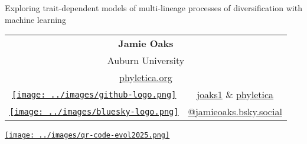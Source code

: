 \begin{frame}[t]
    \begin{columns}[c]

        \begin{minipage}[c][\headlessframetextheight][c]{\columnwidth}
        \begin{center}

            \begin{displaybox}[0.88\linewidth]
            \begin{center}
                \begin{minipage}[c][0.22\textheight][c]{0.88\linewidth}
                \begin{center}
                    \large Exploring trait-dependent models of multi-lineage
                    processes of diversification with machine learning
                \end{center}
                \end{minipage}
            \end{center}
            \end{displaybox}

            \vspace{2.5ex}
            \setlength{\tabcolsep}{0.15em}
            \begin{tabular}{@{}cc@{}}
                \multicolumn{2}{c}{\large\bf Jamie Oaks} \\
                \multicolumn{2}{c}{Auburn University} \\ %
                \multicolumn{2}{c}{\href{https://phyletica.org}{phyletica.org}} \\
                \href{https://github.com/joaks1}{\texttt{[image: ../images/github-logo.png]}}
                & \href{https://github.com/joaks1}{joaks1} \& \href{https://github.com/phyletica}{phyletica} \\
                \href{https://bsky.app/profile/jamieoaks.bsky.social}{\texttt{[image: ../images/bluesky-logo.png]}}
                & \href{https://bsky.app/profile/jamieoaks.bsky.social}{{@}jamieoaks.bsky.social} \\
            \end{tabular}

            \vspace{0.5ex}
            \begin{center}
                \href{https://phyletica.org/slides/evol2025.pdf}{%
                \texttt{[image: ../images/qr-code-evol2025.png]}}
            \end{center}


\end{center}
\end{minipage}
\end{columns}
\end{frame}
